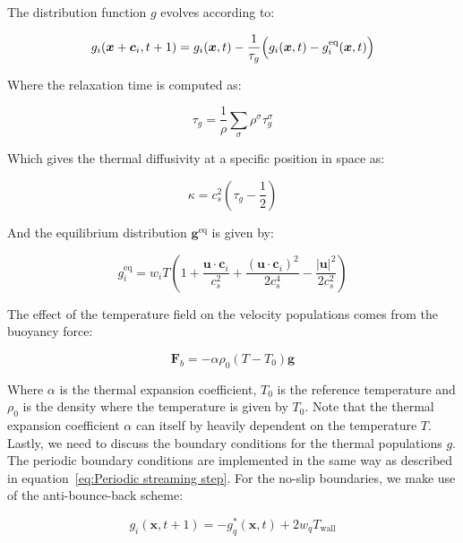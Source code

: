 The distribution function $g$ evolves according to:

\begin{equation}\label{eq:Lattice boltzmann equation temperature}
    g_i(\bm{x} + \bm{c}_i, t+1) = g_i(\bm{x}, t) - \frac{1}{\tau_g}\Bigl(g_i(\bm{x}, t) - g_i^{\text{eq}}(\bm{x}, t)\Bigr)
\end{equation}

Where the relaxation time is computed as:

\begin{equation}\label{eq:relaxation time }
    \tau_g = \frac{1}{\rho}\sum_\sigma \rho^\sigma \tau^\sigma_g
\end{equation}

Which gives the thermal diffusivity at a specific position in space as:

\begin{equation}
    \kappa = c_s^2 \left(\tau_g - \frac{1}{2}\right)
\end{equation}

And the equilibrium distribution $\bm{g}^{\text{eq}}$ is given by:

\begin{equation}
    g^{\text{eq}}_i = w_i T \left(1 + \frac{\bm{u} \cdot \bm{c}_i}{c_s^2} + \frac{{\left(\bm{u} \cdot \bm{c}_i\right)}^2}{2c_s^4} - \frac{|\bm{u}|^2}{2c_s^2}\right)
\end{equation}

The effect of the temperature field on the velocity populations comes from the buoyancy force:

\begin{equation}\label{eq:Buoyancy force}
    \bm{F}_b = -\alpha \rho_0 \left(T - T_0\right)\bm{g}
\end{equation}

Where $\alpha$ is the thermal expansion coefficient, $T_0$ is the reference temperature and $\rho_0$ is the density where the temperature is given by $T_0$. Note that the thermal expansion coefficient $\alpha$ can itself by heavily dependent on the temperature $T$. Lastly, we need to discuss the boundary conditions for the thermal populations $g$. The periodic boundary conditions are implemented in the same way as described in equation~\ref{eq:Periodic streaming step}. For the no-slip boundaries, we make use of the anti-bounce-back scheme:

\begin{equation}\label{eq:Streaming anti-bounce-back}
    g_i(\bm{x}, t+1) = -g^\ast_q(\bm{x}, t) + 2 w_q T_{\text{wall}}
\end{equation}


